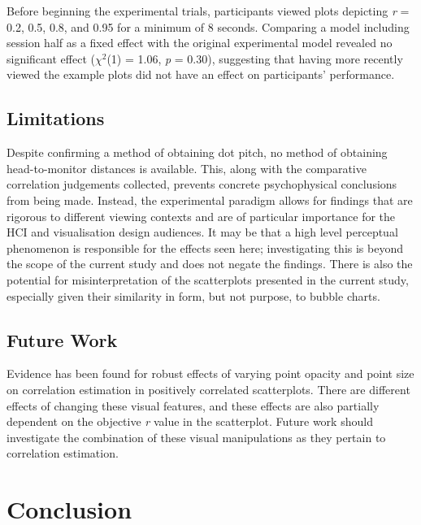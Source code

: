 \documentclass[../main.tex]{subfiles}
\begin{document}
Before beginning the experimental trials, participants viewed plots
depicting \emph{r} = 0.2, 0.5, 0.8, and 0.95 for a minimum of 8 seconds.
Comparing a model including session half as a fixed effect with the
original experimental model revealed no significant effect
(\(\chi^2\)(1) = 1.06, \emph{p} = 0.30), suggesting that having more
recently viewed the example plots did not have an effect on
participants' performance.

\subsection{Limitations}\label{limitations-e3}

Despite confirming a method of obtaining dot pitch, no method of
obtaining head-to-monitor distances is available. This, along with the
comparative correlation judgements collected, prevents concrete
psychophysical conclusions from being made. Instead, the experimental
paradigm allows for findings that are rigorous to different viewing
contexts and are of particular importance for the HCI and visualisation
design audiences. It may be that a high level perceptual phenomenon is
responsible for the effects seen here; investigating this is beyond the
scope of the current study and does not negate the findings. There is
also the potential for misinterpretation of the scatterplots presented
in the current study, especially given their similarity in form, but not
purpose, to bubble charts.

\subsection{Future Work}\label{future-work-e3}

Evidence has been found for robust effects of varying point opacity and
point size on correlation estimation in positively correlated
scatterplots. There are different effects of changing these visual
features, and these effects are also partially dependent on the
objective \emph{r} value in the scatterplot. Future work should
investigate the combination of these visual manipulations as they
pertain to correlation estimation.

\section{Conclusion}\label{conclusion-chap5}
\end{document}

